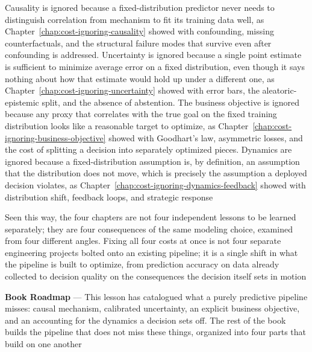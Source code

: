 Causality is ignored because a fixed-distribution predictor never needs to
distinguish correlation from mechanism to fit its training data well, as Chapter~\ref{chap:cost-ignoring-causality}
showed with confounding, missing counterfactuals, and the structural failure modes
that survive even after confounding is addressed. Uncertainty is ignored because
a single point estimate is sufficient to minimize average error on a fixed
distribution, even though it says nothing about how that estimate would hold up under
a different one, as Chapter~\ref{chap:cost-ignoring-uncertainty} showed with
error bars, the aleatoric-epistemic split, and the absence of abstention. The business
objective is ignored because any proxy that correlates with the true goal on the
fixed training distribution looks like a reasonable target to optimize, as
Chapter~\ref{chap:cost-ignoring-business-objective} showed with Goodhart's law, asymmetric
losses, and the cost of splitting a decision into separately optimized pieces. Dynamics
are ignored because a fixed-distribution assumption is, by definition, an assumption
that the distribution does not move, which is precisely the assumption a
deployed decision violates, as Chapter~\ref{chap:cost-ignoring-dynamics-feedback}
showed with distribution shift, feedback loops, and strategic response

Seen this way, the four chapters are not four independent lessons to be learned separately;
they are four consequences of the same modeling choice, examined from four different
angles. Fixing all four costs at once is not four separate engineering projects
bolted onto an existing pipeline; it is a single shift in what the pipeline is built
to optimize, from prediction accuracy on data already collected to decision
quality on the consequences the decision itself sets in motion

\textbf{Book Roadmap} --- This lesson has catalogued what a purely predictive
pipeline misses: causal mechanism, calibrated uncertainty, an explicit business
objective, and an accounting for the dynamics a decision sets off. The rest of
the book builds the pipeline that does not miss these things, organized into
four parts that build on one another

